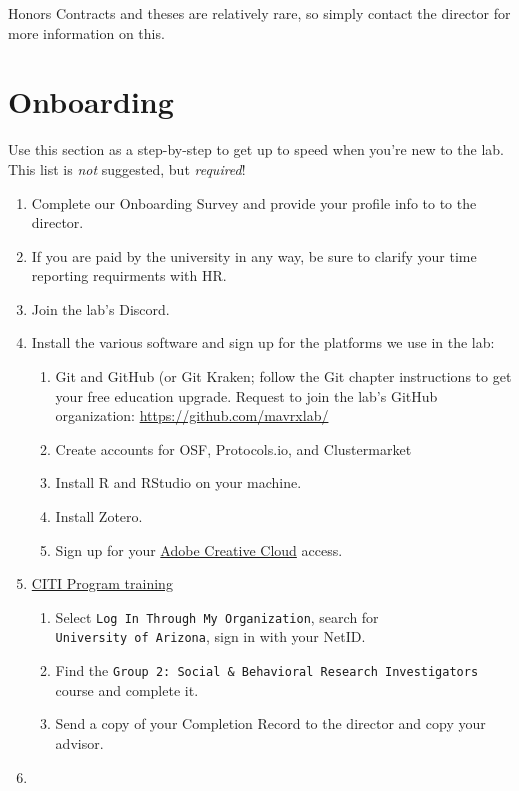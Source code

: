 \documentclass[]{tufte-book}
\providecommand{\tightlist}{%
  \setlength{\itemsep}{0pt}\setlength{\parskip}{0pt}}
\begin{document}
Honors Contracts and theses are relatively rare, so simply contact the director for more information on this.

\hypertarget{onboarding}{%
\chapter{Onboarding}\label{onboarding}}

Use this section as a step-by-step to get up to speed when you're new to the lab. This list is \emph{not} suggested, but \emph{required}!

\begin{enumerate}
\def\labelenumi{\arabic{enumi}.}
\tightlist
\item
  Complete our Onboarding Survey and provide your profile info to to the director.
\item
  If you are paid by the university in any way, be sure to clarify your time reporting requirments with HR.
\item
  Join the lab's Discord.
\item
  Install the various software and sign up for the platforms we use in the lab:

  \begin{enumerate}
  \def\labelenumii{\arabic{enumii}.}
  \tightlist
  \item
    Git and GitHub (or Git Kraken; follow the Git chapter instructions to get your free education upgrade. Request to join the lab's GitHub organization: \url{https://github.com/mavrxlab/}
  \item
    Create accounts for OSF, Protocols.io, and Clustermarket
  \item
    Install R and RStudio on your machine.
  \item
    Install Zotero.
  \item
    Sign up for your \href{https://adobe.arizona.edu/signup/adobe-creative-cloud}{Adobe Creative Cloud} access.
  \end{enumerate}
\item
  \href{https://www.citiprogram.org/?pageID=668}{CITI Program training}

  \begin{enumerate}
  \def\labelenumii{\arabic{enumii}.}
  \tightlist
  \item
    Select \texttt{Log\ In\ Through\ My\ Organization}, search for \texttt{University\ of\ Arizona}, sign in with your NetID.
  \item
    Find the \texttt{Group\ 2:\ Social\ \&\ Behavioral\ Research\ Investigators} course and complete it.
  \item
    Send a copy of your Completion Record to the director and copy your advisor.
  \end{enumerate}
\item
\end{enumerate}
\end{document}
